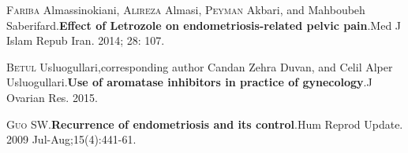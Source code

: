\documentclass[12pt]{article} %
\begin{document}
\vspace{0,5cm}

\textsc{Fariba} Almassinokiani, \textsc{Alireza} Almasi, \textsc{Peyman} Akbari, and Mahboubeh Saberifard.\textbf{Effect of Letrozole on endometriosis-related pelvic pain}.Med J Islam Repub Iran. 2014; 28: 107. 

\vspace{0,5cm}

\textsc{Betul} Usluogullari,corresponding author Candan Zehra Duvan, and Celil Alper Usluogullari.\textbf{Use of aromatase inhibitors in practice of gynecology}.J Ovarian Res. 2015.

\vspace{0,5cm}

\textsc{Guo} SW.\textbf{Recurrence of endometriosis and its control}.Hum Reprod Update. 2009 Jul-Aug;15(4):441-61.
\end{document}
